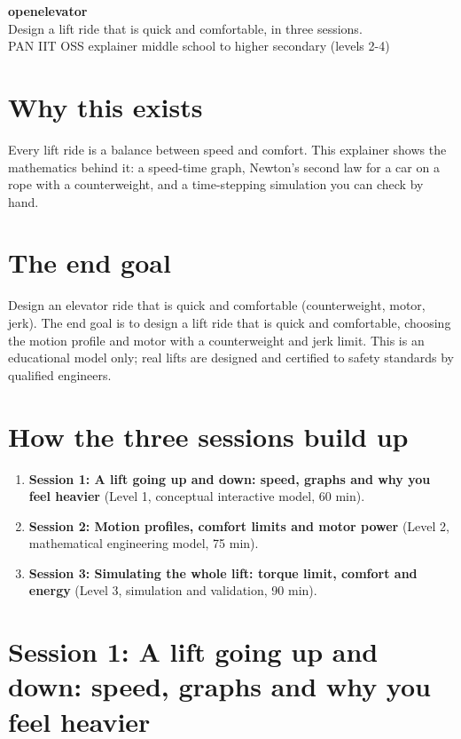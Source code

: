\documentclass[11pt,a4paper]{article}
\begin{document}
\begin{center}{\LARGE\bfseries openelevator}\\[0.4em]{\large Design a lift ride that is quick and comfortable, in three sessions.}\\[0.2em]\small PAN IIT OSS explainer \textbullet{} middle school to higher secondary (levels 2-4)\end{center}

\section*{Why this exists}
Every lift ride is a balance between speed and comfort. This explainer shows the mathematics behind it: a speed-time graph, Newton's second law for a car on a rope with a counterweight, and a time-stepping simulation you can check by hand.

\section*{The end goal}
Design an elevator ride that is quick and comfortable (counterweight, motor, jerk). The end goal is to design a lift ride that is quick and comfortable, choosing the motion profile and motor with a counterweight and jerk limit. This is an educational model only; real lifts are designed and certified to safety standards by qualified engineers.

\section*{How the three sessions build up}
\begin{enumerate}[nosep]
\item \textbf{Session 1: A lift going up and down: speed, graphs and why you feel heavier} (Level 1, conceptual interactive model, 60 min).
\item \textbf{Session 2: Motion profiles, comfort limits and motor power} (Level 2, mathematical engineering model, 75 min).
\item \textbf{Session 3: Simulating the whole lift: torque limit, comfort and energy} (Level 3, simulation and validation, 90 min).
\end{enumerate}

\section{Session 1: A lift going up and down: speed, graphs and why you feel heavier}
\end{document}

